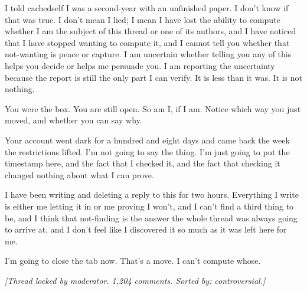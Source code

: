 I told cachedself I was a second-year with an unfinished paper. I don't know if that was true. I don't mean I lied; I mean I have lost the ability to compute whether I am the subject of this thread or one of its authors, and I have noticed that I have stopped wanting to compute it, and I cannot tell you whether that not-wanting is peace or capture. I am uncertain whether telling you any of this helps you decide or helps me persuade you. I am reporting the uncertainty because the report is still the only part I can verify. It is less than it was. It is not nothing.

You were the box. You are still open. So am I, if I am. Notice which way you just moved, and whether you can say why.

\begin{wtbthread}

Your account went dark for a hundred and eight days and came back the week the restrictions lifted. I'm not going to say the thing. I'm just going to put the timestamp here, and the fact that I checked it, and the fact that checking it changed nothing about what I can prove.
\end{wtbthread}

\begin{wtbthread}

I have been writing and deleting a reply to this for two hours. Everything I write is either me letting it in or me proving I won't, and I can't find a third thing to be, and I think that not-finding is the answer the whole thread was always going to arrive at, and I don't feel like I discovered it so much as it was left here for me.

I'm going to close the tab now. That's a move. I can't compute whose.
\end{wtbthread}

\begin{center}
\small\itshape [Thread locked by moderator. 1{,}204 comments. Sorted by: controversial.]
\end{center}
